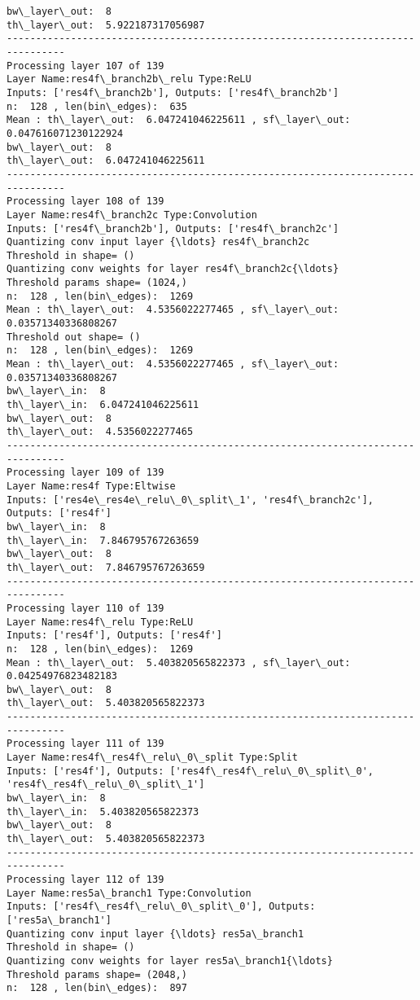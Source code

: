 \documentclass[11pt]{article}
\begin{document}
\begin{Verbatim}[commandchars=\\\{\}]
bw\_layer\_out:  8
th\_layer\_out:  5.922187317056987
--------------------------------------------------------------------------------
Processing layer 107 of 139
Layer Name:res4f\_branch2b\_relu Type:ReLU
Inputs: ['res4f\_branch2b'], Outputs: ['res4f\_branch2b']
n:  128 , len(bin\_edges):  635
Mean : th\_layer\_out:  6.047241046225611 , sf\_layer\_out:  0.047616071230122924
bw\_layer\_out:  8
th\_layer\_out:  6.047241046225611
--------------------------------------------------------------------------------
Processing layer 108 of 139
Layer Name:res4f\_branch2c Type:Convolution
Inputs: ['res4f\_branch2b'], Outputs: ['res4f\_branch2c']
Quantizing conv input layer {\ldots} res4f\_branch2c
Threshold in shape= ()
Quantizing conv weights for layer res4f\_branch2c{\ldots}
Threshold params shape= (1024,)
n:  128 , len(bin\_edges):  1269
Mean : th\_layer\_out:  4.5356022277465 , sf\_layer\_out:  0.03571340336808267
Threshold out shape= ()
n:  128 , len(bin\_edges):  1269
Mean : th\_layer\_out:  4.5356022277465 , sf\_layer\_out:  0.03571340336808267
bw\_layer\_in:  8
th\_layer\_in:  6.047241046225611
bw\_layer\_out:  8
th\_layer\_out:  4.5356022277465
--------------------------------------------------------------------------------
Processing layer 109 of 139
Layer Name:res4f Type:Eltwise
Inputs: ['res4e\_res4e\_relu\_0\_split\_1', 'res4f\_branch2c'], Outputs: ['res4f']
bw\_layer\_in:  8
th\_layer\_in:  7.846795767263659
bw\_layer\_out:  8
th\_layer\_out:  7.846795767263659
--------------------------------------------------------------------------------
Processing layer 110 of 139
Layer Name:res4f\_relu Type:ReLU
Inputs: ['res4f'], Outputs: ['res4f']
n:  128 , len(bin\_edges):  1269
Mean : th\_layer\_out:  5.403820565822373 , sf\_layer\_out:  0.04254976823482183
bw\_layer\_out:  8
th\_layer\_out:  5.403820565822373
--------------------------------------------------------------------------------
Processing layer 111 of 139
Layer Name:res4f\_res4f\_relu\_0\_split Type:Split
Inputs: ['res4f'], Outputs: ['res4f\_res4f\_relu\_0\_split\_0', 'res4f\_res4f\_relu\_0\_split\_1']
bw\_layer\_in:  8
th\_layer\_in:  5.403820565822373
bw\_layer\_out:  8
th\_layer\_out:  5.403820565822373
--------------------------------------------------------------------------------
Processing layer 112 of 139
Layer Name:res5a\_branch1 Type:Convolution
Inputs: ['res4f\_res4f\_relu\_0\_split\_0'], Outputs: ['res5a\_branch1']
Quantizing conv input layer {\ldots} res5a\_branch1
Threshold in shape= ()
Quantizing conv weights for layer res5a\_branch1{\ldots}
Threshold params shape= (2048,)
n:  128 , len(bin\_edges):  897

\end{Verbatim}
\end{document}

